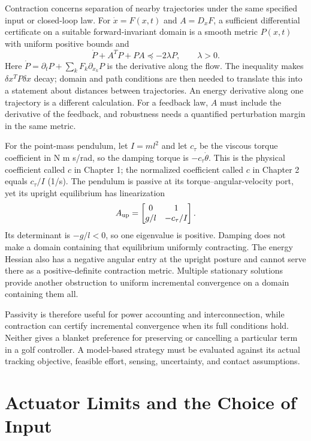 Contraction concerns separation of nearby trajectories under the same specified input or closed-loop law. For $\dot x=F(x,t)$ and $A=D_xF$, a sufficient differential certificate on a suitable forward-invariant domain is a smooth metric $P(x,t)$ with uniform positive bounds and
\begin{equation}
\dot P+A^TP+PA\preceq-2\lambda P,\qquad \lambda>0.
\end{equation}
Here $\dot P=\partial_tP+\sum_kF_k\partial_{x_k}P$ is the derivative along the flow. The inequality makes $\delta x^TP\delta x$ decay; domain and path conditions are then needed to translate this into a statement about distances between trajectories. An energy derivative along one trajectory is a different calculation. For a feedback law, $A$ must include the derivative of the feedback, and robustness needs a quantified perturbation margin in the same metric.

For the point-mass pendulum, let $I=m l^2$ and let $c_\tau$ be the viscous torque coefficient in N m s/rad, so the damping torque is $-c_\tau\dot\theta$. This is the physical coefficient called $c$ in Chapter 1; the normalized coefficient called $c$ in Chapter 2 equals $c_\tau/I$ (1/s). The pendulum is passive at its torque--angular-velocity port, yet its upright equilibrium has linearization
\begin{equation}
A_{\rm up}=\begin{bmatrix}0&1\\g/l&-c_\tau/I\end{bmatrix}.
\end{equation}
Its determinant is $-g/l<0$, so one eigenvalue is positive. Damping does not make a domain containing that equilibrium uniformly contracting. The energy Hessian also has a negative angular entry at the upright posture and cannot serve there as a positive-definite contraction metric. Multiple stationary solutions provide another obstruction to uniform incremental convergence on a domain containing them all.

Passivity is therefore useful for power accounting and interconnection, while contraction can certify incremental convergence when its full conditions hold. Neither gives a blanket preference for preserving or cancelling a particular term in a golf controller. A model-based strategy must be evaluated against its actual tracking objective, feasible effort, sensing, uncertainty, and contact assumptions.

\section{Actuator Limits and the Choice of Input}

